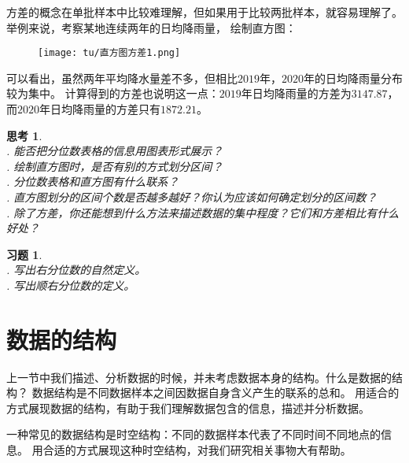 \documentclass[12pt,UTF8]{ctexbook}
\theoremstyle{definition}
\theoremstyle{plain}
\newtheorem{sk}{思考}[section]
\newtheorem{xt}{习题}[section]
\begin{document}
方差的概念在单批样本中比较难理解，但如果用于比较两批样本，就容易理解了。举例来说，考察某地连续两年的日均降雨量，
绘制直方图：
\begin{figure}[H] %
    \vspace{10pt}
    \centering
    \texttt{[image: tu/直方图方差1.png]}
\end{figure}
可以看出，虽然两年平均降水量差不多，但相比$2019$年，$2020$年的日均降雨量分布较为集中。
计算得到的方差也说明这一点：$2019$年日均降雨量的方差为$3147.87$，而$2020$年日均降雨量的方差只有$1872.21$。


\begin{sk}
    \mbox{} \\
    . 能否把分位数表格的信息用图表形式展示？\\
    . 绘制直方图时，是否有别的方式划分区间？\\
    . 分位数表格和直方图有什么联系？\\
    . 直方图划分的区间个数是否越多越好？你认为应该如何确定划分的区间数？\\
    . 除了方差，你还能想到什么方法来描述数据的集中程度？它们和方差相比有什么好处？
\end{sk}

\begin{xt}
    \mbox{} \\
    . 写出右分位数的自然定义。\\
    . 写出顺右分位数的定义。
\end{xt}

\section{数据的结构}
上一节中我们描述、分析数据的时候，并未考虑数据本身的结构。什么是数据的结构？
数据结构是不同数据样本之间因数据自身含义产生的联系的总和。
用适合的方式展现数据的结构，有助于我们理解数据包含的信息，描述并分析数据。

一种常见的数据结构是时空结构：不同的数据样本代表了不同时间不同地点的信息。
用合适的方式展现这种时空结构，对我们研究相关事物大有帮助。
\end{document}
